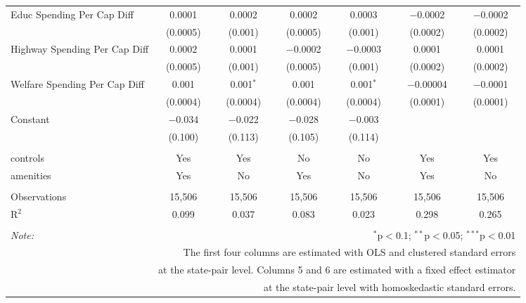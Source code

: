 \begin{table}[!htbp]
\begin{tabular}{@{\extracolsep{5pt}}lcccccc}
  Educ Spending Per Cap Diff & 0.0001 & 0.0002 & 0.0002 & 0.0003 & $-$0.0002 & $-$0.0002 \\ 
  & (0.0005) & (0.001) & (0.0005) & (0.001) & (0.0002) & (0.0002) \\ 
  Highway Spending Per Cap Diff & 0.0002 & 0.0001 & $-$0.0002 & $-$0.0003 & 0.0001 & 0.0001 \\ 
  & (0.0005) & (0.001) & (0.0005) & (0.001) & (0.0002) & (0.0002) \\ 
  Welfare Spending Per Cap Diff & 0.001 & 0.001$^{*}$ & 0.001 & 0.001$^{*}$ & $-$0.00004 & $-$0.0001 \\ 
  & (0.0004) & (0.0004) & (0.0004) & (0.0004) & (0.0001) & (0.0001) \\ 
  Constant & $-$0.034 & $-$0.022 & $-$0.028 & $-$0.003 &  &  \\ 
  & (0.100) & (0.113) & (0.105) & (0.114) &  &  \\ 
 \hline \\[-1.8ex] 
controls & Yes & Yes & No & No & Yes & Yes \\ 
amenities & Yes & No & Yes & No & Yes & No \\ 
\hline \\[-1.8ex] 
Observations & 15,506 & 15,506 & 15,506 & 15,506 & 15,506 & 15,506 \\ 
R$^{2}$ & 0.099 & 0.037 & 0.083 & 0.023 & 0.298 & 0.265 \\ 
\hline 
\hline \\[-1.8ex] 
\textit{Note:}  & \multicolumn{6}{r}{$^{*}$p$<$0.1; $^{**}$p$<$0.05; $^{***}$p$<$0.01} \\ 
 & \multicolumn{6}{r}{The first four columns are estimated with OLS and clustered standard errors} \\ 
 & \multicolumn{6}{r}{at the state-pair level. Columns 5 and 6 are estimated with a fixed effect estimator} \\ 
 & \multicolumn{6}{r}{at the state-pair level with homoskedastic standard errors.} \\ 
\end{tabular} 
\end{table} 
